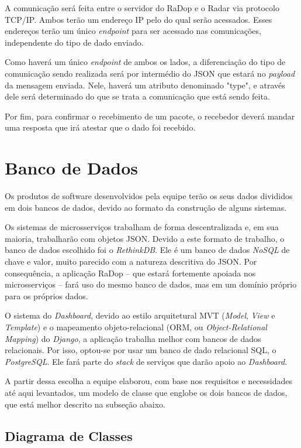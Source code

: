 A comunicação será feita entre o servidor do RaDop e o Radar via protocolo TCP/IP. Ambos terão um endereço IP pelo do qual serão acessados. Esses endereços terão um único \textit{endpoint} para ser acessado nas comunicações, independente do tipo de dado enviado.

Como haverá um único \textit{endpoint} de ambos os lados, a diferenciação do tipo de comunicação sendo realizada será por intermédio do JSON que estará no \textit{payload} da mensagem enviada. Nele, haverá um atributo denominado "type", e através dele será determinado do que se trata a comunicação que está sendo feita.

Por fim, para confirmar o recebimento de um pacote, o recebedor deverá mandar uma resposta que irá atestar que o dado foi recebido.

\section{Banco de Dados}

Os produtos de software desenvolvidos pela equipe terão os seus dados divididos em dois bancos de dados, devido ao formato da construção de alguns sistemas.

Os sistemas de microsserviços trabalham de forma descentralizada e, em sua maioria, trabalharão com objetos JSON. Devido a este formato de trabalho, o banco de dados escolhido foi o \textit{RethinkDB}. Ele é um banco de dados \textit{NoSQL} de chave e valor, muito parecido com a natureza descritiva do JSON. Por consequência, a aplicação RaDop -- que estará fortemente apoiada nos microsserviços -- fará uso do mesmo banco de dados, mas em um domínio próprio para os próprios dados.

O sistema do \textit{Dashboard}, devido ao estilo arquitetural MVT (\textit{Model}, \textit{View} e \textit{Template}) e o mapeamento objeto-relacional (ORM, ou \textit{Object-Relational Mapping}) do \textit{Django}, a aplicação trabalha melhor com bancos de dados relacionais. Por isso, optou-se por usar um banco de dado relacional SQL, o \textit{PostgreSQL}. Ele fará parte do \textit{stack} de serviços que darão apoio ao \textit{Dashboard}.

A partir dessa escolha a equipe elaborou, com base nos requisitos e necessidades até aqui levantados, um modelo de classe que englobe os dois bancos de dados, que está melhor descrito na subseção abaixo.

\subsection{Diagrama de Classes}

